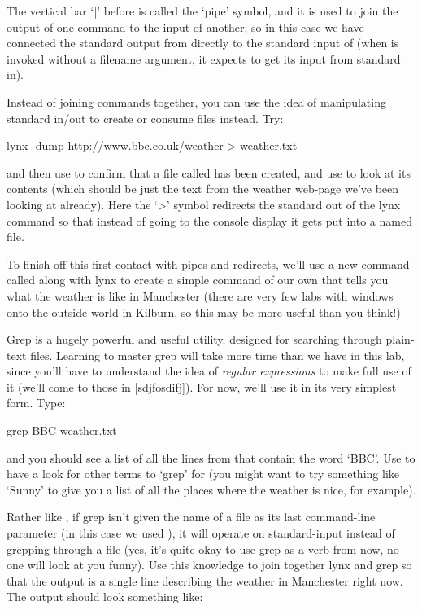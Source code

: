 The vertical bar `|' before  is called the `pipe' symbol, and it is used to join the output of one command to the input of another; so in this case we have connected the standard output from  directly to the standard input of  (when  is invoked without a filename argument, it expects to get its input from standard in). 

Instead of joining commands together, you can use the idea of manipulating standard in/out to create or consume files instead. Try:

\begin{ttoutenv}
lynx -dump http://www.bbc.co.uk/weather > weather.txt
\end{ttoutenv}

and then use  to confirm that a file called  has been created, and use  to look at its contents (which should be just the text from the weather web-page we've been looking at already). Here the `>' symbol redirects the standard out of the lynx command so that instead of going to the console display it gets put into a named file. 

To finish off this first contact with pipes and redirects, we'll use a new command called  along with lynx to create a simple command of our own that tells you what the weather is like in Manchester (there are very few labs with windows onto the outside world in Kilburn, so this may be more useful than you think!) 

Grep is a hugely powerful and useful utility, designed for searching through plain-text files. Learning to master grep will take more time than we have in this lab, since you'll have to understand the idea of \textit{regular expressions} to make full use of it (we'll come to those in \ref{sdjfosdifj}). For now, we'll use it in its very simplest form. Type:

\begin{ttoutenv}
grep BBC weather.txt
\end{ttoutenv}

and you should see a list of all the lines from  that contain the word `BBC'. Use  to have a look for other terms to `grep' for (you might want to try something like `Sunny' to give you a list of all the places where the weather is nice, for example). 

Rather like , if grep isn't given the name of a file as its last command-line parameter (in this case we used ), it will operate on standard-input instead of grepping through a file (yes, it's quite okay to use grep as a verb from now, no one will look at you funny). Use this knowledge to join together lynx and grep so that the output is a single line describing the weather in Manchester right now. The output should look something like:

